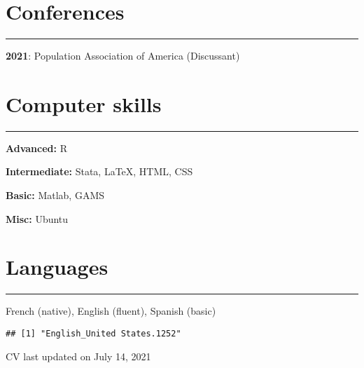 \documentclass{article}
\newcommand{\sectionline}{%
  \vspace{-0.2cm}%
  \hrule%
  \vspace{0.3cm}%
}
\let\xsection=\section
\renewcommand{\section}[1]{%
  \xsection*{#1}%
  \sectionline%
}
\begin{document}
\hypertarget{conferences}{%
\section{Conferences}\label{conferences}}

\textbf{2021}: Population Association of America (Discussant)

\hypertarget{computer-skills}{%
\section{Computer skills}\label{computer-skills}}

\textbf{Advanced:} R

\textbf{Intermediate:} Stata, LaTeX, HTML, CSS

\textbf{Basic:} Matlab, GAMS

\textbf{Misc:} Ubuntu

\hypertarget{languages}{%
\section{Languages}\label{languages}}

French (native), English (fluent), Spanish (basic)

\vspace{2cm}

\begin{verbatim}
## [1] "English_United States.1252"
\end{verbatim}

\begin{center}
CV last updated on July 14, 2021
\end{center}
\end{document}

